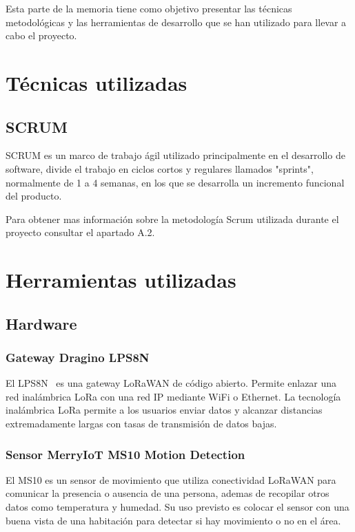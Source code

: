 Esta parte de la memoria tiene como objetivo presentar las técnicas metodológicas y las herramientas de desarrollo que se han utilizado para llevar a cabo el proyecto.

\section{Técnicas utilizadas}
\subsection{SCRUM}
SCRUM es un marco de trabajo ágil utilizado principalmente en el desarrollo de software, divide el trabajo en ciclos cortos y regulares llamados "sprints", normalmente de 1 a 4 semanas, en los que se desarrolla un incremento funcional del producto.

Para obtener mas información sobre la metodología Scrum utilizada durante el proyecto consultar el apartado A.2.

\section{Herramientas utilizadas}
\subsection{Hardware}
\subsubsection{Gateway Dragino LPS8N}
El LPS8N~\cite{Haw:Dra} es una gateway LoRaWAN de código abierto. Permite enlazar una red inalámbrica LoRa con una red IP mediante WiFi o Ethernet. La tecnología inalámbrica LoRa permite a los usuarios enviar datos y alcanzar distancias extremadamente largas con tasas de transmisión de datos bajas.


\subsubsection{Sensor MerryIoT MS10 Motion Detection}
El MS10 es un sensor de movimiento que utiliza conectividad LoRaWAN para comunicar la presencia o ausencia de una persona, ademas de recopilar otros datos como temperatura y humedad.  Su uso previsto es colocar el sensor con una buena vista de una habitación para detectar si hay movimiento o no en el área.

